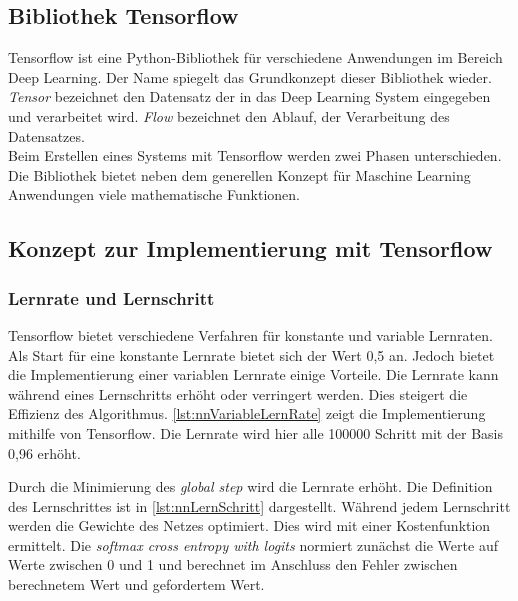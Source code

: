\subsection{Bibliothek Tensorflow}
Tensorflow ist eine Python-Bibliothek für verschiedene Anwendungen im Bereich Deep Learning. 
Der Name spiegelt das Grundkonzept dieser Bibliothek wieder. 
\textit{Tensor} bezeichnet den Datensatz der in das Deep Learning System 
eingegeben und verarbeitet wird. \textit{Flow} bezeichnet den Ablauf, 
der Verarbeitung des Datensatzes. \\
Beim Erstellen eines Systems mit Tensorflow werden zwei Phasen 
unterschieden. 
Die Bibliothek bietet neben dem generellen Konzept für Maschine Learning Anwendungen 
viele mathematische Funktionen. 
\cite{tf:2018}

\subsection{Konzept zur Implementierung mit Tensorflow}
\subsubsection{Lernrate und Lernschritt}
Tensorflow bietet verschiedene Verfahren für konstante und variable Lernraten. 
Als Start für eine konstante Lernrate bietet sich der Wert 0,5 an. Jedoch bietet 
die Implementierung einer variablen Lernrate einige Vorteile. Die Lernrate kann während 
eines Lernschritts erhöht oder verringert werden. Dies steigert die Effizienz des Algorithmus. 
\autoref{lst:nnVariableLernRate} zeigt die Implementierung mithilfe von Tensorflow. 
Die Lernrate wird hier alle 100000 Schritt mit der Basis 0,96 erhöht. 



Durch die Minimierung des \textit{global step} wird die Lernrate erhöht. 
Die Definition des Lernschrittes ist in \autoref{lst:nnLernSchritt} dargestellt.
Während jedem Lernschritt werden die Gewichte des Netzes optimiert.
Dies wird mit einer Kostenfunktion ermittelt. 
Die \textit{softmax cross entropy with logits} normiert zunächst die Werte auf Werte zwischen 0 und 1 und berechnet im 
Anschluss den Fehler zwischen berechnetem Wert und gefordertem Wert.



